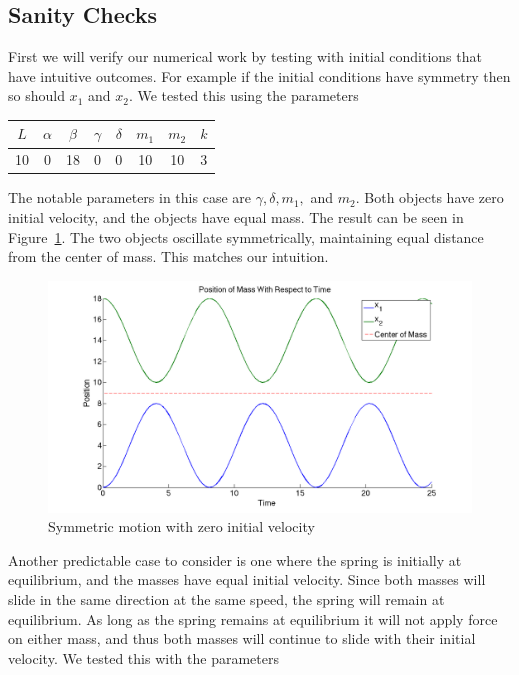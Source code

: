 \documentclass[11pt, oneside]{article}   	%
\begin{document}
\subsection{Sanity Checks}
First we will verify our numerical work by testing with initial conditions that have intuitive outcomes. For example if the initial conditions have symmetry then so should $x_1$ and $x_2$. We tested this using the parameters
\begin{center}

\begin{tabular}{| c | c | c | c | c | c | c | c |}

\hline

$L$ & $\alpha$ & $\beta$ & $\gamma$ & $\delta$ & $m_1$ & $m_2$ & $k$ \\

\hline

 10 & 0 & 18 & 0 & 0 & 10 & 10 & 3\\

\hline

\end{tabular}

\end{center}

The notable parameters in this case are $\gamma, \delta, m_1, $ and $m_2$.
Both objects have zero initial velocity, and the objects have equal mass.
The result can be seen in Figure~\ref{sanity1}.
The two objects oscillate symmetrically, maintaining equal distance from the center of mass.
This matches our intuition.

\begin{figure}[h!]
\centering \includegraphics[scale=0.3]{sanity1}
\caption{\label{sanity1} Symmetric motion with zero initial velocity}
\end{figure}

Another predictable case to consider is one where the spring is initially at equilibrium, and the masses have equal initial velocity.
Since both masses will slide in the same direction at the same speed, the spring will remain at equilibrium. As long as the spring remains at equilibrium it will not apply force on either mass, and thus both masses will continue to slide with their initial velocity.
We tested this with the parameters
\end{document}
